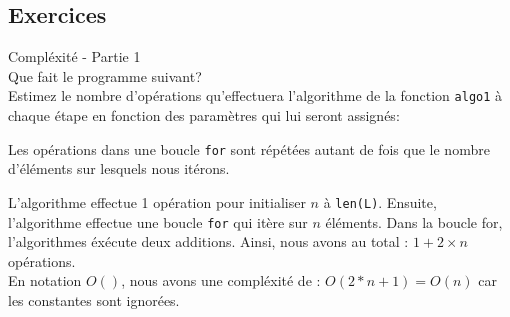 \subsection{Exercices}

\begin{Exercice}[5 min] Compléxité - Partie 1\\
    Que fait le programme suivant? \\
    Estimez le nombre d'opérations qu'effectuera l'algorithme de la fonction \lstinline{algo1} à chaque étape en fonction des paramètres qui lui seront assignés:
    
\begin{conseil}
   Les opérations dans une boucle \lstinline{for} sont répétées autant de fois que le 
   nombre d'éléments sur lesquels nous itérons.
\end{conseil}
    
\begin{solution}
L'algorithme effectue 1 opération pour initialiser $n$ à \lstinline{len(L)}. Ensuite, l'algorithme
effectue une boucle \lstinline{for} qui itère sur $n$ éléments. Dans la boucle for, l'algorithmes éxécute deux additions.
Ainsi, nous avons au total : $1 + 2\times n$ opérations. \\
En notation $O()$, nous avons une compléxité de : $O(2*n + 1) = O(n)$ car les constantes sont ignorées.    
\end{solution}

\end{Exercice}

